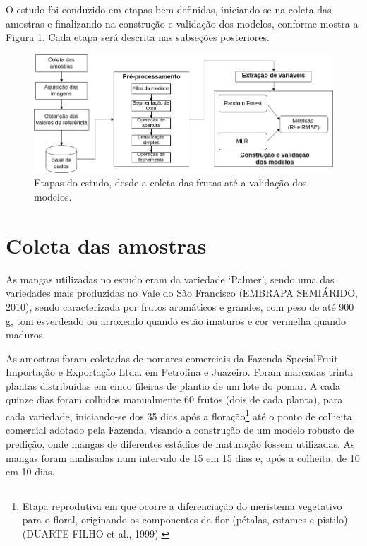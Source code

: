 O estudo foi conduzido em etapas bem definidas, iniciando-se na coleta das amostras e finalizando na construção e validação dos modelos, conforme mostra a Figura \ref{fig:diag}. Cada etapa será descrita nas subseções posteriores.

\begin{figure}[H]
\centering
    \caption{Etapas do estudo, desde a coleta das frutas até a validação dos modelos.}\label{fig:diag}
    \includegraphics[scale=0.5]{img/diag.png}
\end{figure}

\section{Coleta das amostras}

As mangas utilizadas no estudo eram da variedade ‘Palmer’, sendo uma das variedades mais produzidas no Vale do São Francisco (EMBRAPA SEMIÁRIDO, 2010), sendo caracterizada por frutos aromáticos e grandes, com peso de até 900 g, tom esverdeado ou arroxeado quando estão imaturos e cor vermelha quando maduros. 

As amostras foram coletadas de pomares comerciais da Fazenda SpecialFruit Importação e Exportação Ltda. em Petrolina e Juazeiro. Foram marcadas trinta plantas distribuídas em cinco fileiras de plantio de um lote do pomar. A cada quinze dias foram colhidos manualmente 60 frutos (dois de cada planta), para cada variedade, iniciando-se dos 35 dias após a floração\footnote{\label{ftnote:floracao} Etapa reprodutiva em que ocorre a diferenciação do meristema vegetativo para o floral, originando os componentes da flor (pétalas, estames e pistilo) (DUARTE FILHO et al., 1999).} até o ponto de colheita comercial adotado pela Fazenda, visando a construção de um modelo robusto de predição, onde mangas de diferentes estádios de maturação fossem utilizadas. As mangas foram analisadas num intervalo de 15 em 15 dias e, após a colheita, de 10 em 10 dias.

